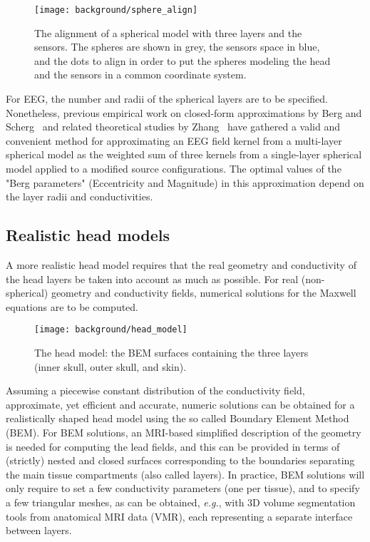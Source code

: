\begin{figure}
\centering
	\texttt{[image: background/sphere\_align]}
    \caption{The alignment of a spherical model with three layers and the sensors. The spheres are shown in grey, the sensors space in blue, and the dots to align in order to put the spheres modeling the head and the sensors in a common coordinate system.}
	\label{fig:sphere_align}
\end{figure}

For EEG, the number and radii of the spherical layers are to be specified. Nonetheless, previous empirical work on closed-form approximations by Berg and Scherg~\cite{berg1994fast} and related theoretical studies by Zhang~\cite{zhang1995fast} have gathered a valid and convenient method for approximating an EEG field kernel from a multi-layer spherical model as the weighted sum of three kernels from a single-layer spherical model applied to a modified source configurations. The optimal values of the "Berg parameters" (Eccentricity and Magnitude) in this approximation depend on the layer radii and conductivities.

\subsection*{Realistic head models}
A more realistic head model requires that the real geometry and conductivity of the head layers be taken into account as much as possible. For real (non-spherical) geometry and conductivity fields, numerical solutions for the Maxwell equations are to be computed.\\
\begin{figure}
\centering
	\texttt{[image: background/head\_model]}
    \caption{The head model: the BEM surfaces containing the three layers (inner skull, outer skull, and skin).}
	\label{fig:head_model}
\end{figure}
Assuming a piecewise constant distribution of the conductivity field, approximate, yet efficient and accurate, numeric solutions can be obtained for a realistically shaped head model using the so called Boundary Element Method (BEM). For BEM solutions, an MRI-based simplified description of the geometry is needed for computing the lead fields, and this can be provided in terms of (strictly) nested and closed surfaces corresponding to the boundaries separating the main tissue compartments (also called layers).
In practice, BEM solutions will only require to set a few conductivity parameters (one per tissue), and to specify a few triangular meshes, as can be obtained, \textit{e.g.}, with 3D volume segmentation tools from anatomical MRI data (VMR), each representing a separate interface between layers. \\

